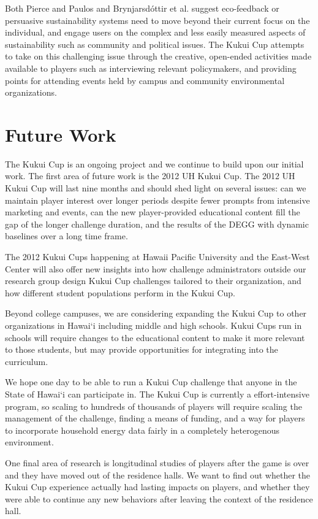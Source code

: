 \documentclass{sigchi}
\newcommand{\Hawaii}{Hawai`i\xspace}
\begin{document}
Both Pierce and Paulos and Brynjarsd\'{o}ttir et al. suggest eco-feedback or persuasive sustainability systems need to move beyond their current focus on the individual, and engage users on the complex and less easily measured aspects of sustainability such as community and political issues. The Kukui Cup attempts to take on this challenging issue through the creative, open-ended activities made available to players such as interviewing relevant policymakers, and providing points for attending events held by campus and community environmental organizations.


\section{Future Work}

The Kukui Cup is an ongoing project and we continue to build upon our initial work. The first area of future work is the 2012 UH Kukui Cup. The 2012 UH Kukui Cup will last nine months and should shed light on several issues: can we  maintain player interest over longer periods despite fewer prompts from intensive marketing and events, can the new player-provided educational content fill the gap of the longer challenge duration, and the results of the DEGG with dynamic baselines over a long time frame.

The 2012 Kukui Cups happening at Hawaii Pacific University and the East-West Center will also offer new insights into how challenge administrators outside our research group design Kukui Cup challenges tailored to their organization, and how different student populations perform in the Kukui Cup.

Beyond college campuses, we are considering expanding the Kukui Cup to other organizations in \Hawaii including middle and high schools. Kukui Cups run in schools will require changes to the educational content to make it more relevant to those students, but may provide opportunities for integrating into the curriculum.

We hope one day to be able to run a Kukui Cup challenge that anyone in the State of \Hawaii can participate in. The Kukui Cup is currently a effort-intensive program, so scaling to hundreds of thousands of players will require scaling the management of the challenge, finding a means of funding, and a way for players to incorporate household energy data fairly in a completely heterogenous environment.

One final area of research is longitudinal studies of players after the game is over and they have moved out of the residence halls. We want to find out whether the Kukui Cup experience actually had lasting impacts on players, and whether they were able to continue any new behaviors after leaving the context of the residence hall.
\end{document}
